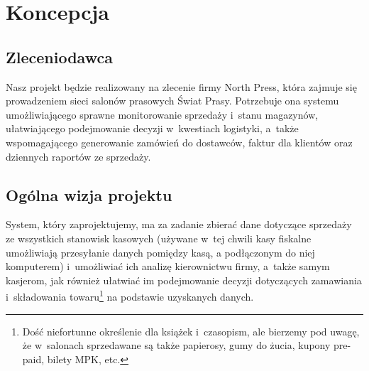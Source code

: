 \section{Koncepcja}
\subsection{Zleceniodawca}
Nasz projekt będzie realizowany na zlecenie firmy North Press, która zajmuje się
prowadzeniem sieci salonów prasowych Świat Prasy. Potrzebuje ona systemu umożliwiającego
sprawne monitorowanie sprzedaży i~stanu magazynów, ułatwiającego podejmowanie decyzji w~kwestiach
logistyki, a~także wspomagającego generowanie zamówień do dostawców, faktur dla
klientów oraz dziennych raportów ze sprzedaży.

\subsection{Ogólna wizja projektu}
System, który zaprojektujemy, ma za zadanie zbierać dane dotyczące sprzedaży ze wszystkich
stanowisk kasowych (używane w~tej chwili kasy fiskalne umożliwiają przesyłanie danych pomiędzy
kasą, a podłączonym do niej komputerem) i~umożliwiać ich analizę kierownictwu firmy, a~także
samym kasjerom, jak również ułatwiać im podejmowanie decyzji dotyczących zamawiania i~składowania
towaru\footnote{Dość niefortunne określenie dla książek i~czasopism, ale bierzemy pod uwagę,
że w~salonach sprzedawane są także papierosy, gumy do żucia, kupony pre-paid, bilety MPK, etc.}
na podstawie uzyskanych danych.

